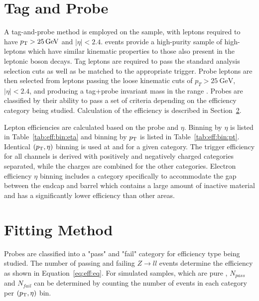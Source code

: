 % 
% 


\section{Tag and Probe}\label{ch:eff:tagandprobe}
A tag-and-probe method is employed on the \zll sample, with leptons required to have $p_{\mathrm{T}}>25\,\text{Ge\hspace{-.08em}V}$ and $|\eta|<2.4$. \zll events provide a high-purity sample of high-\pt leptons which have similar kinematic properties to those also present in the leptonic \W boson decays\cite{Khachatryan:2010xn}. Tag leptons are required to pass the standard analysis selection cuts as well as be matched to the appropriate trigger. Probe leptons are then selected from leptons passing the loose kinematic cuts of $p_T > 25 \mathrm{~GeV}$,~$|\eta|<2.4$, and producing a tag+probe invariant mass in the range \masswindow. Probes are classified by their ability to pass a set of criteria depending on the efficiency category being studied. Calculation of the efficiency is described in Section~\ref{ch:eff:fitting}.

Lepton efficiencies are calculated based on the probe \pt and $\eta$. Binning by $\eta$ is listed in Table~\ref{tab:eff:bin:eta} and binning by $p_{\mathrm{T}}$ is listed in Table~\ref{tab:eff:bin:pt}. Identical $(p_{\mathrm{T}},\eta)$ binning is used at \sg and \sh for a given category. The trigger efficiency for all channels is derived with positively and negatively charged categories separated, while the charges are combined for the other categories. Electron efficiency $\eta$ binning includes a category specifically to accommodate the gap between the endcap and barrel which contains a large amount of inactive material and has a significantly lower efficiency than other areas.






\section{Fitting Method}\label{ch:eff:fitting}
Probes are classified into a "pass" and "fail" category for efficiency type being studied. The number of passing and failing $Z\rightarrow ll$ events determine the efficiency as shown in Equation~\ref{eq:eff:eq}. For simulated samples, which are pure \zll, $N_{pass}$ and $N_{fail}$ can be determined by counting the number of events in each category per $(p_{\mathrm{T}},\eta)$ bin. 

